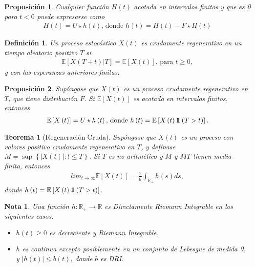 \documentclass{article}
\newtheorem{Def}{Definición}
\newtheorem{Teo}{Teorema}
\newtheorem{Note}{Nota}
\newtheorem{Prop}{Proposición}
\newcommand{\rea}{\mathbb{R}}
\newcommand{\esp}{\mathbb{E}}
\newcommand{\indora}{\mbox{$1$\hspace{-0.8ex}$1$}}
\begin{document}
\begin{Prop}
Cualquier funci\'on $H\left(t\right)$ acotada en intervalos finitos y que es 0 para $t<0$ puede expresarse como
\begin{eqnarray*}
H\left(t\right)=U\star h\left(t\right)\textrm{,  donde }h\left(t\right)=H\left(t\right)-F\star H\left(t\right)
\end{eqnarray*}
\end{Prop}

\begin{Def}
Un proceso estoc\'astico $X\left(t\right)$ es crudamente regenerativo en un tiempo aleatorio positivo $T$ si
\begin{eqnarray*}
\esp\left[X\left(T+t\right)|T\right]=\esp\left[X\left(t\right)\right]\textrm{, para }t\geq0,\end{eqnarray*}
y con las esperanzas anteriores finitas.
\end{Def}

\begin{Prop}
Sup\'ongase que $X\left(t\right)$ es un proceso crudamente regenerativo en $T$, que tiene distribuci\'on $F$. Si $\esp\left[X\left(t\right)\right]$ es acotado en intervalos finitos, entonces
\begin{eqnarray*}
\esp\left[X\left(t\right)\right]=U\star h\left(t\right)\textrm{,  donde }h\left(t\right)=\esp\left[X\left(t\right)\indora\left(T>t\right)\right].
\end{eqnarray*}
\end{Prop}

\begin{Teo}[Regeneraci\'on Cruda]
Sup\'ongase que $X\left(t\right)$ es un proceso con valores positivo crudamente regenerativo en $T$, y def\'inase $M=\sup\left\{|X\left(t\right)|:t\leq T\right\}$. Si $T$ es no aritm\'etico y $M$ y $MT$ tienen media finita, entonces
\begin{eqnarray*}
lim_{t\rightarrow\infty}\esp\left[X\left(t\right)\right]=\frac{1}{\mu}\int_{\rea_{+}}h\left(s\right)ds,
\end{eqnarray*}
donde $h\left(t\right)=\esp\left[X\left(t\right)\indora\left(T>t\right)\right]$.
\end{Teo}


\begin{Note} Una funci\'on $h:\rea_{+}\rightarrow\rea$ es Directamente Riemann Integrable en los siguientes casos:
\begin{itemize}
\item[a)] $h\left(t\right)\geq0$ es decreciente y Riemann Integrable.
\item[b)] $h$ es continua excepto posiblemente en un conjunto de Lebesgue de medida 0, y $|h\left(t\right)|\leq b\left(t\right)$, donde $b$ es DRI.
\end{itemize}
\end{Note}
\end{document}
